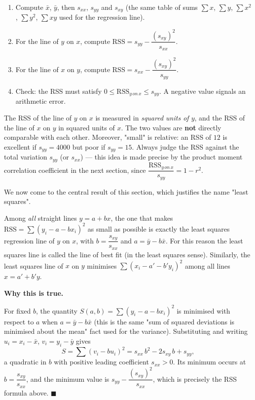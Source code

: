 \documentclass[11pt]{article}
\newcommand{\cle}[1]{{\popxbold\color{popdark}#1}}
\newcounter{popsec}
\newcounter{popsub}
\newcommand{\courssub}[1]{%
  \stepcounter{popsub}%
  \par\vspace{9pt}\noindent{\popxbold\fontsize{11.5}{13}\selectfont\color{popink}{\color{poporange}\thepopsec.\thepopsub}\hspace{6pt}#1}\par\nopagebreak\vspace{4pt}
}
\begin{document}
\begin{methode}
\begin{enumerate}
\item Compute $\bar{x}$, $\bar{y}$, then $s_{xx}$, $s_{yy}$ and $s_{xy}$ (the same table of sums $\sum x$, $\sum y$, $\sum x^2$, $\sum y^2$, $\sum xy$ used for the regression line).
\item For the line of $y$ on $x$, compute $\mathrm{RSS} = s_{yy} - \dfrac{(s_{xy})^2}{s_{xx}}$.
\item For the line of $x$ on $y$, compute $\mathrm{RSS} = s_{xx} - \dfrac{(s_{xy})^2}{s_{yy}}$.
\item Check: the RSS must satisfy $0 \le \mathrm{RSS}_{y\,on\,x} \le s_{yy}$. A negative value signals an arithmetic error.
\end{enumerate}
\end{methode}

\begin{attention}
The RSS of the line of $y$ on $x$ is measured in \emph{squared units of $y$}, and the RSS of the line of $x$ on $y$ in squared units of $x$. The two values are \textbf{not} directly comparable with each other. Moreover, "small" is relative: an RSS of $12$ is excellent if $s_{yy} = 4000$ but poor if $s_{yy} = 15$. Always judge the RSS against the total variation $s_{yy}$ (or $s_{xx}$) — this idea is made precise by the product moment correlation coefficient in the next section, since $\dfrac{\mathrm{RSS}_{y\,on\,x}}{s_{yy}} = 1 - r^2$.
\end{attention}

\courssub{The Line of Best Fit}

We now come to the central result of this section, which justifies the name "least squares".

\begin{propriete}
Among \emph{all} straight lines $y = a + bx$, the one that makes $\mathrm{RSS} = \sum (y_i - a - bx_i)^2$ as small as possible is exactly the least squares regression line of $y$ on $x$, with $b = \dfrac{s_{xy}}{s_{xx}}$ and $a = \bar{y} - b\bar{x}$. For this reason the least squares line is called the \cle{line of best fit} (in the least squares sense). Similarly, the least squares line of $x$ on $y$ minimises $\sum (x_i - a' - b'y_i)^2$ among all lines $x = a' + b'y$.
\end{propriete}

\textbf{Why this is true.}\par
For fixed $b$, the quantity $S(a,b) = \sum (y_i - a - bx_i)^2$ is minimised with respect to $a$ when $a = \bar{y} - b\bar{x}$ (this is the same "sum of squared deviations is minimised about the mean" fact used for the variance). Substituting and writing $u_i = x_i - \bar{x}$, $v_i = y_i - \bar{y}$ gives
\[ S = \sum (v_i - b u_i)^2 = s_{xx}\, b^2 - 2 s_{xy}\, b + s_{yy}, \]
a quadratic in $b$ with positive leading coefficient $s_{xx} > 0$. Its minimum occurs at $b = \dfrac{s_{xy}}{s_{xx}}$, and the minimum value is $s_{yy} - \dfrac{(s_{xy})^2}{s_{xx}}$, which is precisely the RSS formula above. $\blacksquare$
\end{document}
